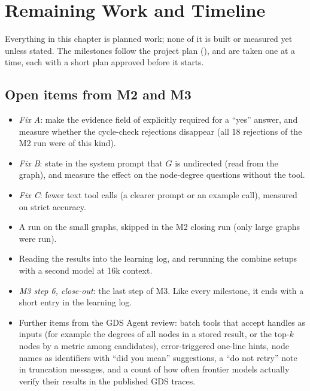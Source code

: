 \chapter{Remaining Work and Timeline}
\label{ch:remaining}

Everything in this chapter is planned work; none of it is built or measured yet unless stated. The milestones follow
the project plan (), and are taken one at a time, each with a short plan approved before it starts.

\section{Open items from M2 and M3}

\begin{itemize}
  \item \emph{Fix A}: make the evidence field of  explicitly required for a ``yes'' answer, and
        measure whether the cycle-check rejections disappear (all 18 rejections of the M2 run were of this kind).
  \item \emph{Fix B}: state in the system prompt that $G$ is undirected (read from the graph), and measure the effect
        on the node-degree questions without the  tool.
  \item \emph{Fix C}: fewer text tool calls (a clearer prompt or an example call), measured on strict accuracy.
  \item A run on the small graphs, skipped in the M2 closing run (only large graphs were run).
  \item Reading the  results into the learning log, and rerunning the combine setups with a second
        model at 16k context.
  \item \emph{M3 step 6, close-out}: the last step of M3. Like every milestone, it ends with a short entry in the
        learning log.
  \item Further items from the GDS Agent review: batch tools that accept handles as inputs (for example the degrees of
        all nodes in a stored result, or the top-$k$ nodes by a metric among candidates), error-triggered one-line
        hints, node names as identifiers with ``did you mean'' suggestions, a ``do not retry'' note in truncation
        messages, and a count of how often frontier models actually verify their results in the published GDS traces.
\end{itemize}

